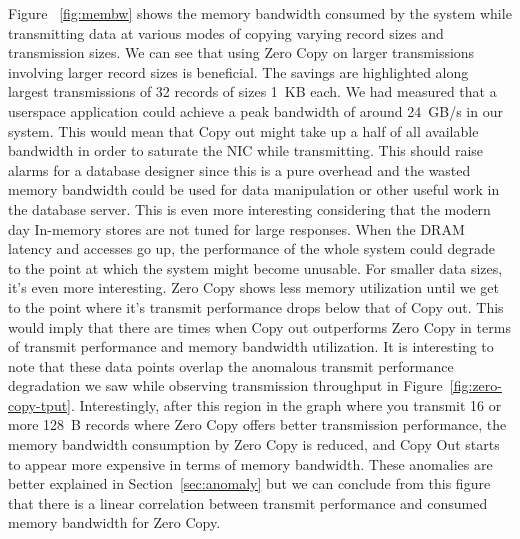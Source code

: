 Figure ~\ref{fig:membw} shows the memory bandwidth consumed by the system while transmitting data at various modes 
of copying varying record sizes and transmission sizes. We can see that using Zero Copy on larger transmissions involving 
larger record sizes is beneficial. The savings are highlighted along largest transmissions of 32 records of sizes 1~KB each. 
 We had measured that a userspace application could achieve a peak bandwidth of around 24~GB/s in our system. This would mean that Copy out 
 might take up a half of all available bandwidth in order to saturate the NIC while transmitting. This should raise alarms for a database 
 designer since this is a pure overhead and the wasted memory bandwidth could be used for data manipulation or other useful work in the database 
 server. This is even more interesting considering that the modern day In-memory stores are not tuned for large responses.
  When the DRAM latency and accesses go up, the performance of the whole system could degrade to the point at which the system might become unusable.
For smaller data sizes, it's even more interesting. Zero Copy shows less memory utilization until we get to the point where it's transmit performance 
drops below that of Copy out. This would imply that there are times when Copy out outperforms Zero Copy in terms of transmit performance and 
memory bandwidth utilization. It is interesting to note that these data points overlap the anomalous transmit performance 
degradation we saw while observing transmission throughput in Figure~\ref{fig:zero-copy-tput}. Interestingly, after this region in the graph 
where you transmit 16 or more 128~B records where Zero Copy offers better transmission performance, the memory bandwidth consumption by Zero Copy 
is reduced, and Copy Out starts to appear more expensive in terms of memory bandwidth. These anomalies are better explained in Section~\ref{sec:anomaly} but we 
can conclude from this figure that there is a linear correlation between transmit performance and consumed memory bandwidth for Zero Copy.
\newline



